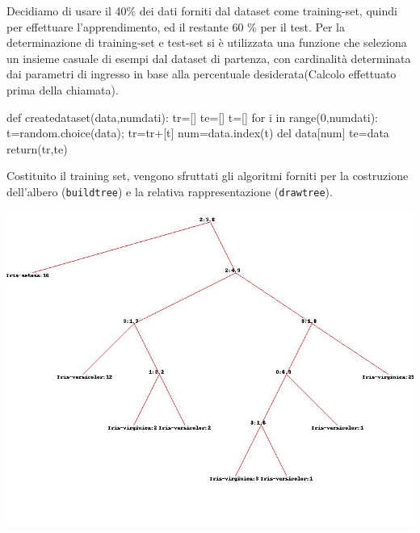 			Decidiamo di usare il 40\% dei dati forniti dal dataset come training-set, quindi per effettuare l'apprendimento, ed il restante 60 \% per il test. Per la determinazione di training-set e test-set si è utilizzata una funzione che seleziona un insieme casuale di esempi dal dataset di partenza, con cardinalità determinata dai parametri di ingresso in base alla percentuale desiderata(Calcolo effettuato prima della chiamata).
			\bigskip
			\begin{python}
		def createdataset(data,numdati):
			tr=[]
			te=[]
			t=[]
			for i in range(0,numdati):
				t=random.choice(data);
				tr=tr+[t]
				num=data.index(t)
				del data[num]
			te=data
			return(tr,te)
			\end{python}
			\bigskip
			Costituito il training set, vengono sfruttati gli algoritmi forniti per la costruzione dell'albero (\texttt{buildtree}) e la relativa rappresentazione (\texttt{drawtree}).
		
			\includegraphics[scale=0.55]{iris.jpg}
		
